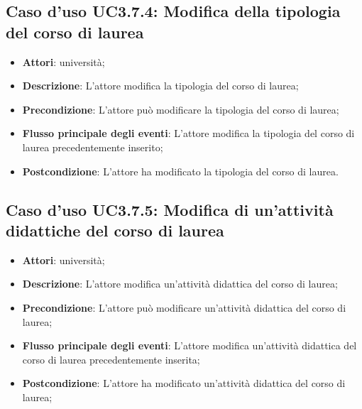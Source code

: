 \subsection{Caso d'uso \texorpdfstring{UC3.7.4}{UC3.7.4}: Modifica della tipologia del corso di laurea}
\begin{itemize}
\item \textbf{Attori}: università;
\item \textbf{Descrizione}: L'attore modifica la tipologia del corso di laurea;

\item \textbf{Precondizione}: L'attore può modificare la tipologia del corso di laurea;

\item \textbf{Flusso principale degli eventi}: L'attore modifica la tipologia del corso di laurea precedentemente inserito;

\item \textbf{Postcondizione}: L'attore ha modificato la tipologia del corso di laurea.

\end{itemize}
\subsection{Caso d'uso \texorpdfstring{UC3.7.5}{UC3.7.5}: Modifica di un'attività didattiche del corso di laurea}
\begin{itemize}
\item \textbf{Attori}: università;
\item \textbf{Descrizione}: L'attore modifica un'attività didattica del corso di laurea;

\item \textbf{Precondizione}: L'attore può modificare un'attività didattica del corso di laurea;

\item \textbf{Flusso principale degli eventi}: L'attore modifica un'attività didattica del corso di laurea precedentemente inserita;

\item \textbf{Postcondizione}: L'attore ha modificato un'attività didattica del corso di laurea;

\end{itemize}
